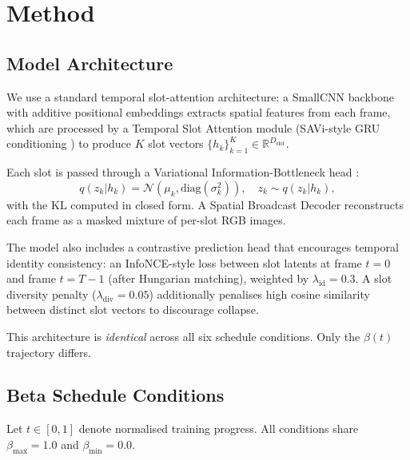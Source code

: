 \documentclass{article}
\begin{document}
\section{Method}

\subsection{Model Architecture}

We use a standard temporal slot-attention architecture:
a SmallCNN backbone with additive positional embeddings extracts spatial
features from each frame, which are processed by a
Temporal Slot Attention module (SAVi-style GRU conditioning
\cite{kipf2021conditional}) to produce $K$ slot vectors
$\{h_k\}_{k=1}^K \in \mathbb{R}^{D_\text{slot}}$.

Each slot is passed through a Variational Information-Bottleneck head
\cite{alemi2017deep}:
\begin{equation}
  q(z_k | h_k) = \mathcal{N}(\mu_k, \text{diag}(\sigma_k^2)),
  \quad z_k \sim q(z_k | h_k),
\end{equation}
with the KL computed in closed form.
A Spatial Broadcast Decoder \cite{watters2019spatial} reconstructs each frame
as a masked mixture of per-slot RGB images.

The model also includes a contrastive prediction head that encourages temporal
identity consistency: an InfoNCE-style loss \cite{oord2018representation}
between slot latents at frame $t=0$ and frame $t=T-1$ (after Hungarian matching),
weighted by $\lambda_\text{id}=0.3$.
A slot diversity penalty ($\lambda_\text{div}=0.05$) additionally penalises
high cosine similarity between distinct slot vectors to discourage collapse.

This architecture is \emph{identical} across all six schedule conditions.
Only the $\beta(t)$ trajectory differs.

\subsection{Beta Schedule Conditions}

Let $t \in [0, 1]$ denote normalised training progress.
All conditions share $\beta_\text{max} = 1.0$ and $\beta_\text{min} = 0.0$.
\end{document}
